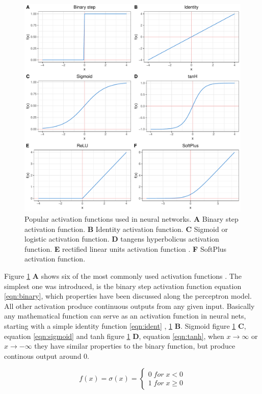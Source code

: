 \begin{figure}[H]
\centering
\includegraphics[height=.55\textheight, width=.85\textwidth]{Figures/activation}
\decoRule
\caption[Popular activation functions for neural networks]{Popular activation functions used in neural networks.
  \textbf{A} Binary step activation function.
  \textbf{B} Identity activation function.
  \textbf{C} Sigmoid or logistic activation function.
  \textbf{D} tangens hyperbolicus activation function.
  \textbf{E} rectified linear units activation function .
  \textbf{F} SoftPlus activation function.}
\label{fig:activation}
\end{figure}

Figure \ref{fig:activation} \textbf{A} shows six of the most commonly used activation functions
\cite{warner1996understanding}.  The simplest one was introduced, is the binary step activation function
equation \ref{eqn:binary}, which properties have been discussed along the perceptron model. All other
activation produce continuous outputs from any given input. Basically any mathematical function can serve as
an activation function in neural nets, starting with a simple identity function \ref{eqn:ident} ,
\ref{fig:activation} \textbf{B}.  Sigmoid figure \ref{fig:activation} \textbf{C}, equation \ref{eqn:sigmoid}
and tanh figure \ref{fig:activation} \textbf{D}, equation \ref{eqn:tanh}, when $x \rightarrow \infty$ or
$x \rightarrow -\infty$ they have similar properties to the binary function, but produce continous output
around 0.


\begin{equation}
  f(x)= \sigma(x) = \left\{
  \begin{array}{ll}
    0 \; for \; x < 0 \\ 
    1 \; for \; x \geq 0
  \end{array}
\right .
\label{eqn:binary}
\end{equation}


